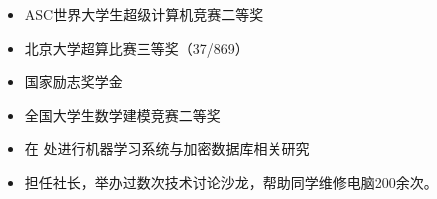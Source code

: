 \documentclass[zh]{resume}
\begin{document}
\begin{itemize}
  \item ASC世界大学生超级计算机竞赛二等奖
\item 北京大学超算比赛三等奖（37/869）
  \item 国家励志奖学金
  \item 全国大学生数学建模竞赛二等奖
\end{itemize}

\begin{itemize}
  \item 在
处进行机器学习系统与加密数据库相关研究
\end{itemize}


\begin{competences}
\end{competences}


\begin{itemize}
\item 担任社长，举办过数次技术讨论沙龙，帮助同学维修电脑200余次。
\end{itemize}
\end{document}
